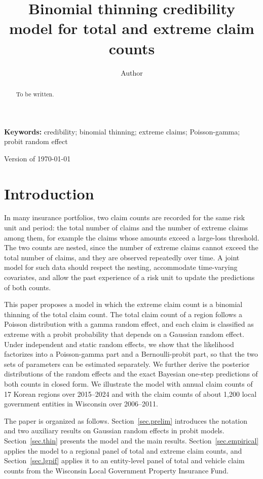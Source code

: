 \documentclass[11pt,authoryear]{elsarticle}
\numberwithin{equation}{section}
\begin{document}
\begin{titlepage}
\thispagestyle{empty}
\title{Binomial thinning credibility model for total and extreme claim counts}
\author{Author}
\begin{abstract}
To be written.
\end{abstract}
\maketitle
\textbf{Keywords:} credibility; binomial thinning; extreme claims;
Poisson-gamma; probit random effect

\vspace{.2cm}
Version of \today
\end{titlepage}
\newpage


\section{Introduction}
\label{sec.intro}

In many insurance portfolios, two claim counts are recorded for the same
risk unit and period: the total number of claims and the number of
extreme claims among them, for example the claims whose amounts exceed
a large-loss threshold. The two counts are nested, since the number of
extreme claims cannot exceed the total number of claims, and they are
observed repeatedly over time. A joint model for such data should
respect the nesting, accommodate time-varying covariates, and allow the
past experience of a risk unit to update the predictions of both counts.

This paper proposes a model in which the extreme claim count is a
binomial thinning of the total claim count. The total claim count of a
region follows a Poisson distribution with a gamma random effect, and
each claim is classified as extreme with a probit probability that
depends on a Gaussian random effect. Under independent and static
random effects, we show that the likelihood factorizes into a
Poisson-gamma part and a Bernoulli-probit part, so that the two sets of
parameters can be estimated separately. We further derive the posterior
distributions of the random effects and the exact Bayesian one-step
predictions of both counts in closed form. We illustrate the model with
annual claim counts of 17 Korean regions over 2015--2024 and with the
claim counts of about 1{,}200 local government entities in Wisconsin over
2006--2011.

The paper is organized as follows. Section~\ref{sec.prelim} introduces
the notation and two auxiliary results on Gaussian random effects in
probit models. Section~\ref{sec.thin} presents the model and the main
results. Section~\ref{sec.empirical} applies the model to a regional
panel of total and extreme claim counts, and Section~\ref{sec.lgpif}
applies it to an entity-level panel of total and vehicle claim counts
from the Wisconsin Local Government Property Insurance Fund.
\end{document}
